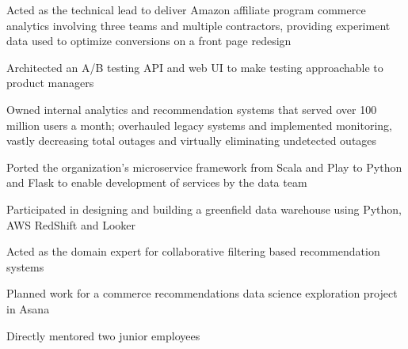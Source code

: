 \begin{job}

  \begin{accomplishments}
    \item Acted as the technical lead to deliver Amazon affiliate program
    commerce analytics involving three teams and multiple contractors, providing
    experiment data used to optimize conversions on a front page redesign
    \item Architected an A/B testing API and web UI to make testing approachable
    to product managers
    \item Owned internal analytics and recommendation systems that served over
    100 million users a month; overhauled legacy systems and implemented
    monitoring, vastly decreasing total outages and virtually eliminating
    undetected outages
  \end{accomplishments}
  \begin{extendedaccomplishments}
    \item Ported the organization's microservice framework from Scala and Play
    to Python and Flask to enable development of services by the data team
    \item Participated in designing and building a greenfield data warehouse
    using Python, AWS RedShift and Looker
    \item Acted as the domain expert for collaborative filtering based
    recommendation systems
    \item Planned work for a commerce recommendations data science exploration
    project in Asana
    \item Directly mentored two junior employees
  \end{extendedaccomplishments}
\end{job}
